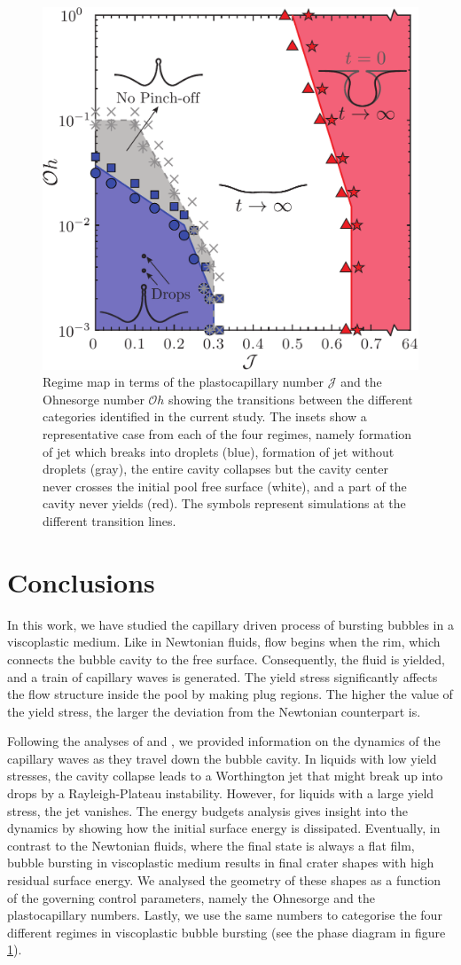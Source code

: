 \documentclass[final]{jfm}
\begin{document}
 \begin{figure}
	\centerline{\includegraphics[width=0.5\linewidth]{Figures/Figure8_RegimeMap-eps-converted-to.pdf}}%
	\caption{Regime map in terms of the plastocapillary number $\mathcal{J}$ and the Ohnesorge number $\mathcal{O}h$ showing the transitions between the different categories identified in the current study. The insets show a representative case from each of the four regimes, namely formation of jet which breaks into droplets (blue), formation of jet without droplets (gray), the entire cavity collapses but the cavity center never crosses the initial pool free surface (white), and a part of the cavity never yields (red). The symbols represent simulations at the different transition lines.}
	\label{fig:Regime_Map}
\end{figure}

\section{Conclusions}\label{Sec::Conclusion}
In this work, we have studied the capillary driven process of bursting bubbles in a viscoplastic medium. Like in Newtonian fluids, flow begins when the rim, which connects the bubble cavity to the free surface. Consequently, the fluid is yielded, and a train of capillary waves is generated. The yield stress significantly affects the flow structure inside the pool by making plug regions. The higher the value of the yield stress, the larger the deviation from the Newtonian counterpart is. 

Following the analyses of \citet{deike2018dynamics} and \citet{gordillo2019capillary}, we provided information on the dynamics of the capillary waves as they travel down the bubble cavity. In liquids with low yield stresses, the cavity collapse leads to a Worthington jet that might break up into drops by a Rayleigh-Plateau instability. However, for liquids with a large yield stress, the jet vanishes. The energy budgets analysis gives insight into the dynamics by showing how the initial surface energy is dissipated. Eventually, in contrast to the Newtonian fluids, where the final state is always a flat film, bubble bursting in viscoplastic medium results in final crater shapes with high residual surface energy. We analysed the geometry of these shapes as a function of the governing control parameters, namely the Ohnesorge and the plastocapillary numbers. Lastly, we use the same numbers to categorise the four different regimes in viscoplastic bubble bursting (see the phase diagram in figure \ref{fig:Regime_Map}).
\end{document}
